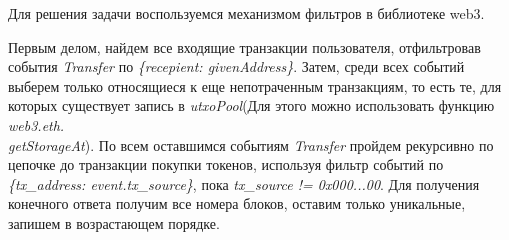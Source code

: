 \solutionSection

Для решения задачи воспользуемся механизмом фильтров в библиотеке web3.

Первым делом, найдем все входящие транзакции пользователя, отфильтровав события \textit{Transfer} по \textit{\{recepient: givenAddress\}}. Затем, среди всех событий выберем только относящиеся к еще непотраченным транзакциям, то есть те, для которых существует запись в \textit{utxoPool}(Для этого можно использовать функцию \textit{web3.eth.}\\\textit{getStorageAt}). По всем оставшимся событиям \textit{Transfer} пройдем рекурсивно по цепочке до транзакции покупки токенов, используя фильтр событий по \textit{\{tx\_address: event.tx\_source\}}, пока \textit{tx\_source != 0x000...00}. Для получения конечного ответа получим все номера блоков, оставим только уникальные, запишем в возрастающем порядке.

\codeExample

